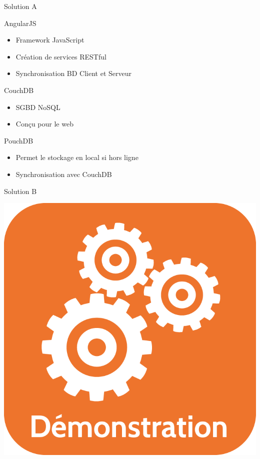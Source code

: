 \author{Juan \textsc{Bermudez}}
\begin{frame}{Solution A}
		\begin{block}{AngularJS}
		\begin{itemize}
			\item Framework JavaScript
			\item Création de services RESTful
			\item Synchronisation BD Client et Serveur
		\end{itemize}
		\end{block}
		\begin{block}{CouchDB}
			\begin{itemize}
			\item SGBD NoSQL
			\item Conçu pour le web
			\end{itemize}
		\end{block}
		\begin{block}{PouchDB}
			\begin{itemize}
			\item Permet le stockage en local si hors ligne
			\item Synchronisation avec CouchDB
			\end{itemize}
		\end{block}
\end{frame}

\begin{frame}{Solution B}
	\vfill
	\begin{center}
		\includegraphics[scale=0.2]{images/gears-icon.png}
	\end{center}
	\vfill
\end{frame}